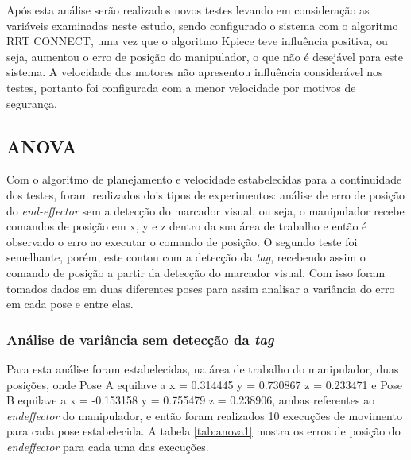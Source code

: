 Após esta análise serão realizados novos testes levando em consideração as variáveis examinadas neste estudo, sendo configurado o sistema com o algoritmo RRT CONNECT, uma vez que o algoritmo Kpiece teve influência positiva, ou seja, aumentou o erro de posição do manipulador, o que não é desejável para este sistema. A velocidade dos motores não apresentou influência considerável nos testes, portanto foi configurada com a menor velocidade por motivos de segurança.

\subsection{ANOVA}

Com o algoritmo de planejamento e velocidade estabelecidas para a continuidade dos testes, foram realizados dois tipos de experimentos: análise de erro de posição do \textit{end-effector} sem a detecção do marcador visual, ou seja, o manipulador recebe comandos de posição em x, y e z dentro da sua área de trabalho e então é observado o erro ao executar o comando de posição. O segundo teste foi semelhante, porém, este contou com a detecção da \textit{tag}, recebendo assim o comando de posição a partir da detecção do marcador visual. Com isso foram tomados dados em duas diferentes poses para assim analisar a variância do erro em cada pose e entre elas. 

\subsubsection{Análise de variância sem detecção da \textit{tag}}

Para esta análise foram estabelecidas, na área de trabalho do manipulador, duas posições, onde Pose A equilave a x = 0.314445 y = 0.730867 z = 0.233471 e Pose B equilave a x = -0.153158 y = 0.755479 z = 0.238906, ambas referentes ao \textit{endeffector} do manipulador, e então foram realizados 10 execuções de movimento para cada pose estabelecida. A tabela \ref*{tab:anova1} mostra os erros de posição do \textit{endeffector} para cada uma das execuções.

